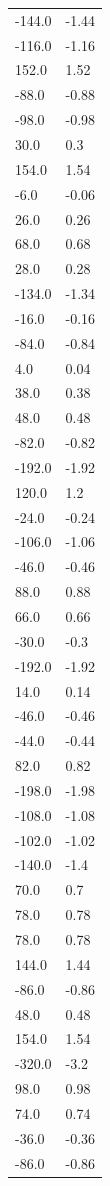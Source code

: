 \begin{longtable}{ll}
-144.0 & -1.44 \\
-116.0 & -1.16 \\
152.0 & 1.52 \\
-88.0 & -0.88 \\
-98.0 & -0.98 \\
30.0 & 0.3 \\
154.0 & 1.54 \\
-6.0 & -0.06 \\
26.0 & 0.26 \\
68.0 & 0.68 \\
28.0 & 0.28 \\
-134.0 & -1.34 \\
-16.0 & -0.16 \\
-84.0 & -0.84 \\
4.0 & 0.04 \\
38.0 & 0.38 \\
48.0 & 0.48 \\
-82.0 & -0.82 \\
-192.0 & -1.92 \\
120.0 & 1.2 \\
-24.0 & -0.24 \\
-106.0 & -1.06 \\
-46.0 & -0.46 \\
88.0 & 0.88 \\
66.0 & 0.66 \\
-30.0 & -0.3 \\
-192.0 & -1.92 \\
14.0 & 0.14 \\
-46.0 & -0.46 \\
-44.0 & -0.44 \\
82.0 & 0.82 \\
-198.0 & -1.98 \\
-108.0 & -1.08 \\
-102.0 & -1.02 \\
-140.0 & -1.4 \\
70.0 & 0.7 \\
78.0 & 0.78 \\
78.0 & 0.78 \\
144.0 & 1.44 \\
-86.0 & -0.86 \\
48.0 & 0.48 \\
154.0 & 1.54 \\
-320.0 & -3.2 \\
98.0 & 0.98 \\
74.0 & 0.74 \\
-36.0 & -0.36 \\
-86.0 & -0.86 \\

\end{longtable}
